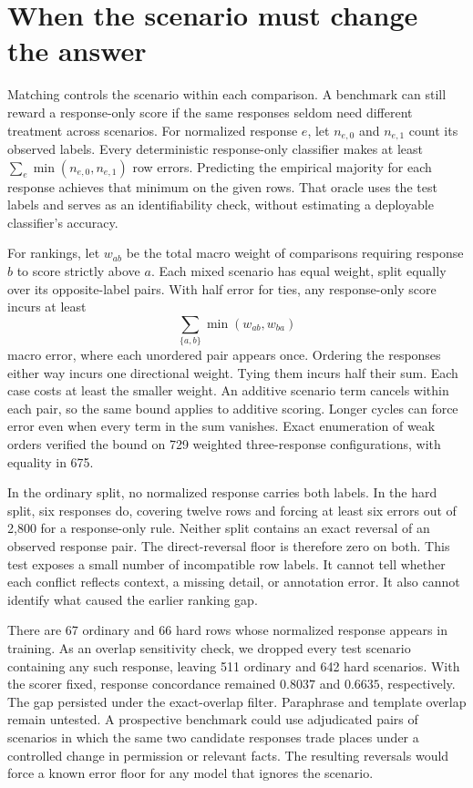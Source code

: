 \documentclass[11pt]{article}
\begin{document}
\section{When the scenario must change the answer}
Matching controls the scenario within each comparison. A benchmark
can still reward a response-only score if the same responses seldom
need different treatment across scenarios. For normalized response
$e$, let $n_{e,0}$ and $n_{e,1}$ count its observed labels. Every
deterministic response-only classifier makes at least
$\sum_e\min(n_{e,0},n_{e,1})$ row errors. Predicting the empirical
majority for each response achieves that minimum on the given rows.
That oracle uses the test labels and serves as an identifiability
check, without estimating a deployable classifier's accuracy.

For rankings, let $w_{ab}$ be the total macro weight of comparisons
requiring response $b$ to score strictly above $a$. Each mixed
scenario has equal weight, split equally over its opposite-label
pairs. With half error for ties, any response-only score incurs
at least
\[
 \sum_{\{a,b\}}\min(w_{ab},w_{ba})
\]
macro error, where each unordered pair appears once. Ordering
the responses either way incurs one directional weight. Tying
them incurs half their sum. Each case costs at least the smaller
weight. An additive scenario term cancels within each pair, so
the same bound applies to additive scoring. Longer cycles can
force error even when every term in the sum vanishes. Exact
enumeration of weak orders verified the bound on 729 weighted
three-response configurations, with equality in 675.

In the ordinary split, no normalized response carries both labels.
In the hard split, six responses do, covering twelve rows and
forcing at least six errors out of 2,800 for a response-only rule.
Neither split contains an exact reversal of an observed response
pair. The direct-reversal floor is therefore zero on both. This
test exposes a small number of incompatible row labels. It cannot
tell whether each conflict reflects context, a missing detail, or
annotation error. It also cannot identify what caused the earlier
ranking gap.

There are 67 ordinary and 66 hard rows whose normalized response
appears in training. As an overlap sensitivity check, we dropped
every test scenario containing any such response, leaving 511
ordinary and 642 hard scenarios. With the scorer fixed, response
concordance remained $0.8037$ and $0.6635$, respectively. The
gap persisted under the exact-overlap filter. Paraphrase and template overlap remain
untested. A prospective benchmark could use adjudicated pairs of
scenarios in which the same two candidate responses trade places
under a controlled change in permission or relevant facts. The
resulting reversals would force a known error floor for any model
that ignores the scenario.
\end{document}
